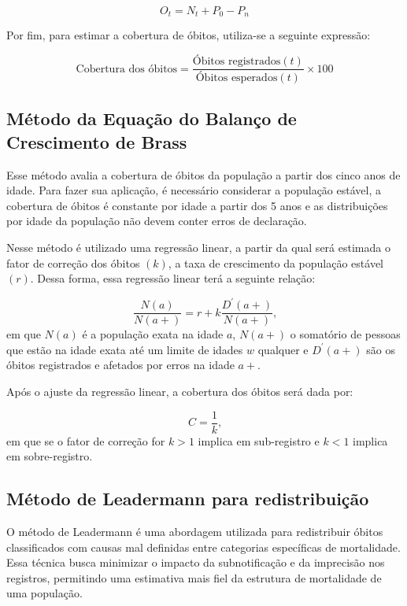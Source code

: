 \documentclass[
  12pt,
  a4paper,
]{scrreprt}
\begin{document}
\[
O_t = N_t + P_{0} - P_n
\]

Por fim, para estimar a cobertura de óbitos, utiliza-se a seguinte
expressão:

\[
\text{Cobertura dos óbitos} = \frac{\text{Óbitos registrados}\left(t\right)}{\text{Óbitos esperados}\left(t\right)} \times 100
\]

\subsection{Método da Equação do Balanço de Crescimento de
Brass}\label{muxe9todo-da-equauxe7uxe3o-do-balanuxe7o-de-crescimento-de-brass}

Esse método avalia a cobertura de óbitos da população a partir dos cinco
anos de idade. Para fazer sua aplicação, é necessário considerar a
população estável, a cobertura de óbitos é constante por idade a partir
dos 5 anos e as distribuições por idade da população não devem conter
erros de declaração.

\vspace{12pt}

Nesse método é utilizado uma regressão linear, a partir da qual será
estimada o fator de correção dos óbitos \(\left(k\right)\), a taxa de
crescimento da população estável \(\left(r\right)\). Dessa forma, essa
regressão linear terá a seguinte relação:

\[
\frac{N\left(a\right)}{N\left(a+\right)} = r + k\frac{D^{'}\left(a+\right)}{N\left(a+\right)}\text{,}
\] em que \(N\left(a\right)\) é a população exata na idade \(a\),
\(N\left(a+\right)\) o somatório de pessoas que estão na idade exata até
um limite de idades \(w\) qualquer e \(D^{'}\left(a+\right)\) são os
óbitos registrados e afetados por erros na idade \(a+\).

\vspace{12pt}

Após o ajuste da regressão linear, a cobertura dos óbitos será dada por:

\[
C = \frac{1}{k}\text{,}
\] em que se o fator de correção for \(k > 1\) implica em sub-registro e
\(k<1\) implica em sobre-registro.

\subsection{Método de Leadermann para
redistribuição}\label{muxe9todo-de-leadermann-para-redistribuiuxe7uxe3o}

O método de Leadermann é uma abordagem utilizada para redistribuir
óbitos classificados com causas mal definidas entre categorias
específicas de mortalidade. Essa técnica busca minimizar o impacto da
subnotificação e da imprecisão nos registros, permitindo uma estimativa
mais fiel da estrutura de mortalidade de uma população.
\end{document}
